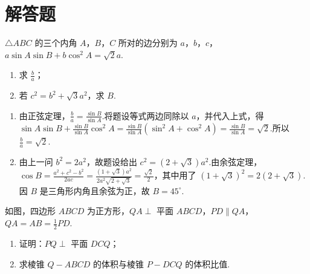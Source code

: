 \section{解答题}

\begin{problem}
\(\triangle ABC\) 的三个内角 \(A\)，\(B\)，\(C\) 所对的边分别为 \(a\)，\(b\)，\(c\)，\(a \sin A \sin B + b \cos^{2} A = \sqrt{2}a\).
\begin{enumerate}
\item 求 \(\frac{b}{a}\)；
\item 若 \(c^{2} = b^{2} + \sqrt{3}a^{2}\)，求 \(B\).
\end{enumerate}
\end{problem}

\begin{solution}
\begin{enumerate}
\item 由正弦定理，\(\displaystyle \frac{b}{a}=\frac{\sin B}{\sin A}\).将题设等式两边同除以 \(a\)，并代入上式，得
\(\displaystyle \sin A\sin B+\frac{\sin B}{\sin A}\cos^2A
=\frac{\sin B}{\sin A}(\sin^2A+\cos^2A)
=\frac{\sin B}{\sin A}=\sqrt2\).所以 \(\displaystyle \frac ba=\sqrt2\).
\item 由上一问 \(b^2=2a^2\)，故题设给出
\(\displaystyle c^2=(2+\sqrt3)a^2\).由余弦定理，
\(\displaystyle \cos B=\frac{a^2+c^2-b^2}{2ac}
=\frac{(1+\sqrt3)a^2}{2a^2\sqrt{2+\sqrt3}}
=\frac{\sqrt2}{2}\)，其中用了 \((1+\sqrt3)^2=2(2+\sqrt3)\).因 \(B\) 是三角形内角且余弦为正，故 \(B=45^\circ\).
\end{enumerate}
\end{solution}

\begin{problem}
如图，四边形 \(ABCD\) 为正方形，\(QA \perp\) 平面 \(ABCD\)，\(PD \parallel QA\)，\(QA = AB = \frac{1}{2}PD\).
\begin{enumerate}
\item 证明：\(PQ \perp\) 平面 \(DCQ\)；
\item 求棱锥 \(Q-ABCD\) 的体积与棱锥 \(P-DCQ\) 的体积比值.
\end{enumerate}

\end{problem}

